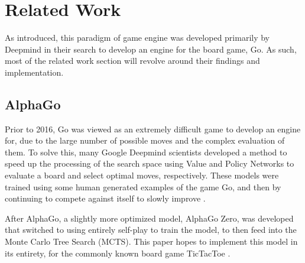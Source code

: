 \section{Related Work}
\label{sec:relatedwork}

As introduced, this paradigm of game engine was developed primarily by Deepmind in their search to develop an engine for the board game, Go. As such, most of the related work section will revolve around their findings and implementation.
\subsection{AlphaGo}
Prior to 2016, Go was viewed as an extremely difficult game to develop an engine for, due to the large number of possible moves and the complex evaluation of them. To solve this, many Google Deepmind scientists developed a method to speed up the processing of the search space using Value and Policy Networks to evaluate a board and select optimal moves, respectively. These models were trained using some human generated examples of the game Go, and then by continuing to compete against itself to slowly improve \cite{AlphaGo}.

After AlphaGo, a slightly more optimized model, AlphaGo Zero, was developed that switched to using entirely self-play to train the model, to then feed into the Monte Carlo Tree Search (MCTS). This paper hopes to implement this model in its entirety, for the commonly known board game TicTacToe \cite{AlphaGoZero}.






